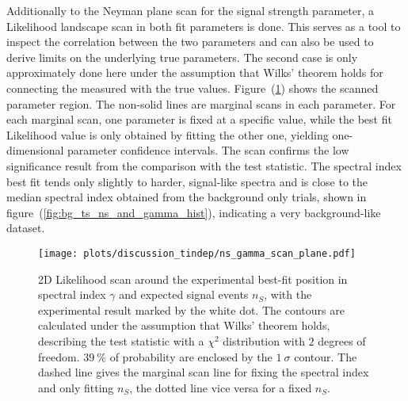 Additionally to the Neyman plane scan for the signal strength parameter, a Likelihood landscape scan in both fit parameters is done.
This serves as a tool to inspect the correlation between the two parameters and can also be used to derive limits on the underlying true parameters.
The second case is only approximately done here under the assumption that Wilks' theorem holds for connecting the measured with the true values.
Figure~(\ref{fig:ns_gamma_scan_plane}) shows the scanned parameter region.
The non-solid lines are marginal scans in each parameter.
For each marginal scan, one parameter is fixed at a specific value, while the best fit Likelihood value is only obtained by fitting the other one, yielding one-dimensional parameter confidence intervals.
The scan confirms the low significance result from the comparison with the test statistic.
The spectral index best fit tends only slightly to harder, signal-like spectra and is close to the median spectral index obtained from the background only trials, shown in figure~(\ref{fig:bg_ts_ns_and_gamma_hist}), indicating a very background-like dataset.

\begin{figure}[htbp]
  \centering
  \texttt{[image: plots/discussion\_tindep/ns\_gamma\_scan\_plane.pdf]}
  \caption[2D LLH scan of $n_S$ and $\gamma$ for the time integrated search]{
    2D Likelihood scan around the experimental best-fit position in spectral index $\gamma$ and expected signal events $n_S$, with the experimental result marked by the white dot.
    The contours are calculated under the assumption that Wilks' theorem holds, describing the test statistic with a $\chi^2$ distribution with $\num{2}$ degrees of freedom.
    $\SI{39}{\percent}$ of probability are enclosed by the $\SI{1}{\sigma}$ contour.
    The dashed line gives the marginal scan line for fixing the spectral index and only fitting $n_S$, the dotted line vice versa for a fixed $n_S$.
  }
  \label{fig:ns_gamma_scan_plane}
\end{figure}


